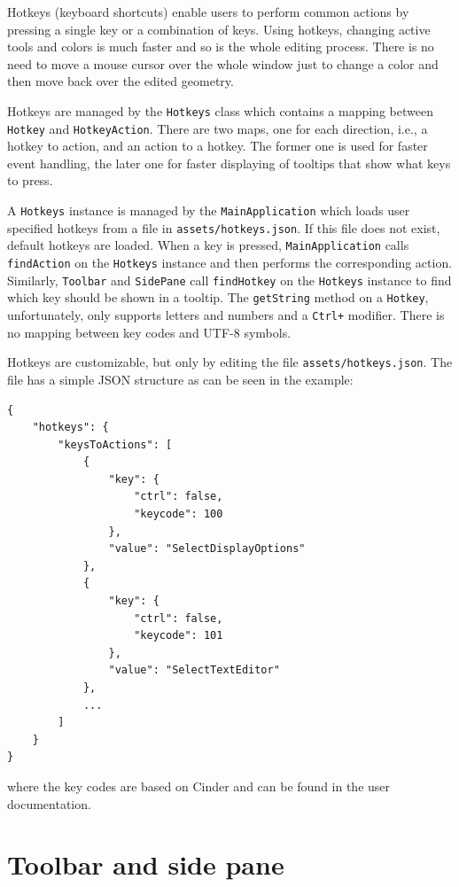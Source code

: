 Hotkeys (keyboard shortcuts) enable users to perform common actions by pressing a single key or a combination of keys.
Using hotkeys, changing active tools and colors is much faster and so is the whole editing process.
There is no need to move a mouse cursor over the whole window just to change a color and then move back over the edited geometry.

Hotkeys are managed by the \texttt{Hotkeys} class which contains a mapping between \texttt{Hotkey} and \texttt{HotkeyAction}.
There are two maps, one for each direction, i.e., a hotkey to action, and an action to a hotkey.
The former one is used for faster event handling, the later one for faster displaying of tooltips that show what keys to press.

A \texttt{Hotkeys} instance is managed by the \texttt{MainApplication} which loads user specified hotkeys from a file in \texttt{assets/hotkeys.json}.
If this file does not exist, default hotkeys are loaded.
When a key is pressed, \texttt{MainApplication} calls \texttt{findAction} on the \texttt{Hotkeys} instance and then performs the corresponding action.
Similarly, \texttt{Toolbar} and \texttt{SidePane} call \texttt{findHotkey} on the \texttt{Hotkeys} instance to find which key should be shown in a tooltip.
The \texttt{getString} method on a \texttt{Hotkey}, unfortunately, only supports letters and numbers and a \texttt{Ctrl+} modifier.
There is no mapping between key codes and UTF-8 symbols.

Hotkeys are customizable, but only by editing the file \texttt{assets/hotkeys.json}.
The file has a simple JSON structure as can be seen in the example:

\begin{lstlisting}
{
    "hotkeys": {
        "keysToActions": [
            {
                "key": {
                    "ctrl": false,
                    "keycode": 100
                },
                "value": "SelectDisplayOptions"
            },
            {
                "key": {
                    "ctrl": false,
                    "keycode": 101
                },
                "value": "SelectTextEditor"
            },
            ...
        ]
    }
}
\end{lstlisting}
where the key codes are based on Cinder and can be found in the user documentation.

\section{Toolbar and side pane}

